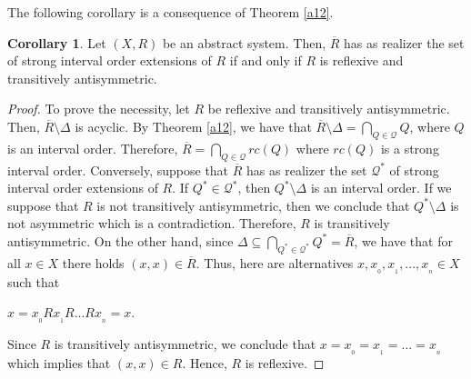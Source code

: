 \documentclass{article}
\theoremstyle{definition}
\newtheorem{corollary}[theorem]{Corollary}
\begin{document}
The following corollary is a consequence of Theorem \ref{a12}. 


\begin{corollary} \label{a212} {\rm Let $(X,R)$ be an abstract system. Then,
$\overline{R}$ has as realizer the set of strong interval order extensions of $R$ if and only if $R$ is reflexive and transitively antisymmetric.}
\end{corollary}
\begin{proof} To prove the necessity, let $R$ be reflexive and transitively antisymmetric.
Then, $\overline{R}\setminus \Delta$ is acyclic.
By Theorem \ref{a12}, we have that $\overline{R}\setminus \Delta=\displaystyle\bigcap_{Q\in \mathcal{Q}}Q$,
where $Q$ is an interval order. Therefore, $\overline{R}=\displaystyle\bigcap_{Q\in \mathcal{Q}}rc(Q)$
where $rc(Q)$ is a strong interval order.
Conversely, suppose that $\overline{R}$ has as realizer the set $\mathcal{Q^{\ast}}$ of strong interval order extensions of $R$.
If $Q^{\ast}\in \mathcal{Q^{\ast}}$, then $Q^{\ast}\setminus \Delta$ is an interval order.
If we suppose that $R$ is not transitively antisymmetric,
then we conclude that $Q^{\ast}\setminus \Delta$ is not asymmetric which is a contradiction.
Therefore, $R$ is transitively antisymmetric. On the other hand, since
$\Delta\subseteq \displaystyle\bigcap_{Q^{\ast}\in \mathcal{Q^{\ast}}}Q^{\ast}=\overline{R}$,
we have that for all $x\in X$ there holds $(x,x)\in \overline{R}$.
Thus, here are alternatives
$x, x_{_0}, x_{_1},..., x_{_n}\in X$ such that
\begin{center}
$x=x_{_0}Rx_{_1}R...Rx_{_n}=x$.
\end{center}
Since
$R$ is transitively antisymmetric, we conclude that $x=x_{_0}=x_{_1}=...=x_{_n}$ which implies that
$(x,x)\in R$. Hence, $R$ is reflexive.
\end{proof}
\end{document}
